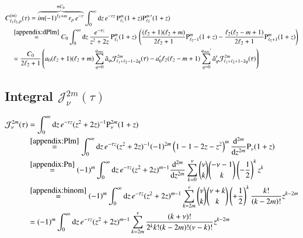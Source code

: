 \documentclass[10pt]{article}
\newcommand{\imag}{i} %
\newcommand{\e}{e}    %
\newcommand{\Plm}[2]{{\text{P}_{#1}^{#2}}}
\newcommand{\sep}{\quad}
\newcommand{\qmax}{{q_\text{max}}}
\begin{document}
\begin{align}
\nonumber
&C_{\ell_1\ell_2,p}^{(m)}(\tau) = \overbrace{\imag m (-1)^{\ell_2+m} \, r_p \, \e^{-\tau}}^{\equiv C_0} \int_0^\infty \mathrm{d}z \, \e^{-\tau z} \, \Plm{\ell_1}{m}(1+z) \Plm{\ell_2}{m}^\prime(1+z) \\
\nonumber
&\sep\overset{\eqref{appendix:dPlm}}{=} C_0 \int_0^\infty \mathrm{d}z \, \frac{\e^{-\tau z}}{z^2+2z} \, \Plm{\ell_1}{m}(1+z) \, \left( \frac{(\ell_2+1)(\ell_2+m)}{2\ell_2+1} \Plm{\ell_2-1}{m}(1+z) - \frac{\ell_2(\ell_2-m+1)}{2\ell_2+1} \Plm{\ell_2+1}{m}(1+z) \right) \\
&\sep = \frac{C_0}{2\ell_2+1} \left(
    a_0 (\ell_2+1)(\ell_2+m) \sum_{q=0}^\qmax \tilde a_q \mathcal{J}_{\ell_1+\ell_2-1-2q}^{2m}(\tau)
    - a_0^\prime \ell_2(\ell_2-m+1) \sum_{q=0}^{\qmax^\prime} \tilde a_q^\prime \mathcal{J}_{\ell_1+\ell_2+1-2q}^{2m}(\tau) \right)
\end{align}


\subsection{Integral $\mathcal{J}_\nu^{2m}(\tau)$}

\begin{align}
\nonumber
\mathcal{J}_\nu^{2m}(\tau) &= \int_0^\infty \mathrm{d}z \, \e^{-\tau z} (z^2+2z)^{-1} \Plm{\nu}{2m}(1+z) \\
\nonumber
&\overset{\eqref{appendix:Plm}}{=} \int_0^\infty \mathrm{d}z \, \e^{-\tau z} (z^2+2z)^{-1} (-1)^{2m} \left(1-1-2z-z^2\right)^m \frac{\mathrm{d}^{2m}}{\mathrm{d}z^{2m}} \Plm{\nu}{}(1+z) \\
\nonumber
&\overset{\eqref{appendix:Pn}}{=} (-1)^m \int_0^\infty \mathrm{d}z \, \e^{-\tau z} (z^2+2z)^{m-1} \frac{\mathrm{d}^{2m}}{\mathrm{d}z^{2m}} \sum_{k=0}^\nu \binom{\nu}{k} \binom{-\nu-1}{k} \left(-\frac{1}{2}\right)^k z^k \\
\nonumber
&\overset{\eqref{appendix:binom}}{=} (-1)^m \int_0^\infty \mathrm{d}z \, \e^{-\tau z} (z^2+2z)^{m-1} \sum_{k=2m}^\nu \binom{\nu}{k} \binom{\nu+k}{k} \left(+\frac{1}{2}\right)^k \frac{k!}{(k-2m)!} z^{k-2m} \\
&= (-1)^m \int_0^\infty \mathrm{d}z \, \e^{-\tau z} (z^2+2z)^{m-1} \sum_{k=2m}^\nu \frac{(k+\nu)!}{2^k k! (k-2m)! (\nu-k)!} z^{k-2m}
\end{align}
\end{document}
